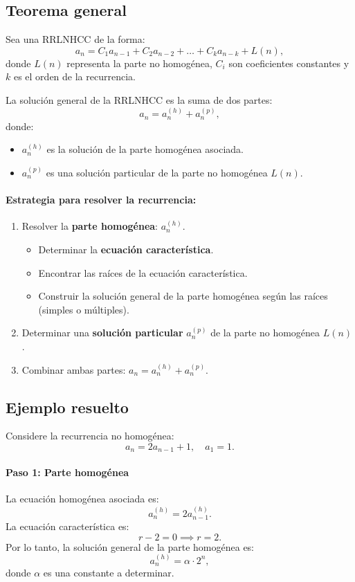 \documentclass{article}
\begin{document}
\subsection{Teorema general}
Sea una RRLNHCC de la forma:
\[
a_n = C_1a_{n-1} + C_2a_{n-2} + \dots + C_ka_{n-k} + L(n),
\]
donde $L(n)$ representa la parte no homogénea, $C_i$ son coeficientes constantes y $k$ es el orden de la recurrencia.

La solución general de la RRLNHCC es la suma de dos partes:
\[
a_n = a_n^{(h)} + a_n^{(p)},
\]
donde:
\begin{itemize}
    \item $a_n^{(h)}$ es la solución de la parte homogénea asociada.
    \item $a_n^{(p)}$ es una solución particular de la parte no homogénea $L(n)$.
\end{itemize}

\paragraph{Estrategia para resolver la recurrencia:}
\begin{enumerate}
    \item Resolver la \textbf{parte homogénea}: $a_n^{(h)}$.
        \begin{itemize}
            \item Determinar la \textbf{ecuación característica}.
            \item Encontrar las raíces de la ecuación característica.
            \item Construir la solución general de la parte homogénea según las raíces (simples o múltiples).
        \end{itemize}
    \item Determinar una \textbf{solución particular} $a_n^{(p)}$ de la parte no homogénea $L(n)$.
    \item Combinar ambas partes: $a_n = a_n^{(h)} + a_n^{(p)}$.
\end{enumerate}

\newpage

\subsection{Ejemplo resuelto}
Considere la recurrencia no homogénea:
\[
a_n = 2a_{n-1} + 1, \quad a_1 = 1.
\]

\paragraph{Paso 1: Parte homogénea}
La ecuación homogénea asociada es:
\[
a_n^{(h)} = 2a_{n-1}^{(h)}.
\]
La ecuación característica es:
\[
r - 2 = 0 \implies r = 2.
\]
Por lo tanto, la solución general de la parte homogénea es:
\[
a_n^{(h)} = \alpha \cdot 2^n,
\]
donde $\alpha$ es una constante a determinar.
\end{document}
